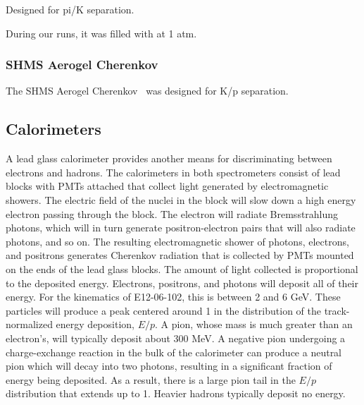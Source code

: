 Designed for pi/K separation.

During our runs, it was filled with  at 1 atm.

\subsubsection{SHMS Aerogel Cherenkov}
The SHMS Aerogel Cherenkov~\cite{Horn_2017} was designed for K/p separation.

\subsection{Calorimeters}
A lead glass calorimeter provides another means for discriminating between
electrons and hadrons.
The calorimeters in both spectrometers consist of lead blocks with
PMTs attached that collect light generated by electromagnetic showers.
The electric field of the nuclei in the block will slow down a high energy
electron passing through the block.
The electron will radiate Bremsstrahlung photons, which will in turn generate
positron-electron pairs that will also radiate photons, and so on.
The resulting electromagnetic shower of photons, electrons, and positrons
generates Cherenkov radiation that is collected by PMTs mounted on the ends
of the lead glass blocks.
The amount of light collected is proportional to the deposited energy.
Electrons, positrons, and photons will deposit all of their energy.
For the kinematics of E12-06-102, this is between 2 and 6 GeV.
These particles will produce a peak centered around 1 in the distribution of
the track-normalized energy deposition, $E/p$.
A pion, whose mass is much greater than an electron's, will typically deposit
about 300 MeV.
A negative pion undergoing a charge-exchange reaction in the bulk of the
calorimeter can produce a neutral pion which will decay into two photons,
resulting in a significant fraction of energy being deposited.
As a result, there is a large pion tail in the $E/p$ distribution that extends
up to 1.
Heavier hadrons typically deposit no energy.

